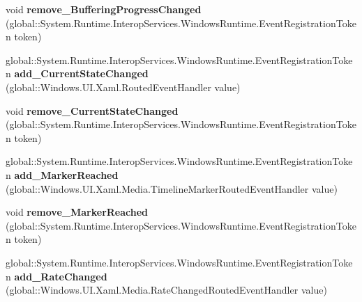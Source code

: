 \begin{DoxyCompactItemize}
\item 
\mbox{\label{class_windows_1_1_u_i_1_1_xaml_1_1_controls_1_1_media_element_a43685deb17b059f17c7f2151a44ba55d}} 
void {\bfseries remove\+\_\+\+Buffering\+Progress\+Changed} (global\+::\+System.\+Runtime.\+Interop\+Services.\+Windows\+Runtime.\+Event\+Registration\+Token token)
\item 
\mbox{\label{class_windows_1_1_u_i_1_1_xaml_1_1_controls_1_1_media_element_ae6fc988c596577fb1e064d953f8d6bdf}} 
global\+::\+System.\+Runtime.\+Interop\+Services.\+Windows\+Runtime.\+Event\+Registration\+Token {\bfseries add\+\_\+\+Current\+State\+Changed} (global\+::\+Windows.\+U\+I.\+Xaml.\+Routed\+Event\+Handler value)
\item 
\mbox{\label{class_windows_1_1_u_i_1_1_xaml_1_1_controls_1_1_media_element_aebdc30f4274c70b12f3c5f0fb3aaf725}} 
void {\bfseries remove\+\_\+\+Current\+State\+Changed} (global\+::\+System.\+Runtime.\+Interop\+Services.\+Windows\+Runtime.\+Event\+Registration\+Token token)
\item 
\mbox{\label{class_windows_1_1_u_i_1_1_xaml_1_1_controls_1_1_media_element_a6083c0220c513d85efe6176f20144ebf}} 
global\+::\+System.\+Runtime.\+Interop\+Services.\+Windows\+Runtime.\+Event\+Registration\+Token {\bfseries add\+\_\+\+Marker\+Reached} (global\+::\+Windows.\+U\+I.\+Xaml.\+Media.\+Timeline\+Marker\+Routed\+Event\+Handler value)
\item 
\mbox{\label{class_windows_1_1_u_i_1_1_xaml_1_1_controls_1_1_media_element_a0808fb3f0499ca8aec86e05b44b1379c}} 
void {\bfseries remove\+\_\+\+Marker\+Reached} (global\+::\+System.\+Runtime.\+Interop\+Services.\+Windows\+Runtime.\+Event\+Registration\+Token token)
\item 
\mbox{\label{class_windows_1_1_u_i_1_1_xaml_1_1_controls_1_1_media_element_ad94df9e8fcffeae53d73f460020d8cf9}} 
global\+::\+System.\+Runtime.\+Interop\+Services.\+Windows\+Runtime.\+Event\+Registration\+Token {\bfseries add\+\_\+\+Rate\+Changed} (global\+::\+Windows.\+U\+I.\+Xaml.\+Media.\+Rate\+Changed\+Routed\+Event\+Handler value)

\end{DoxyCompactItemize}
